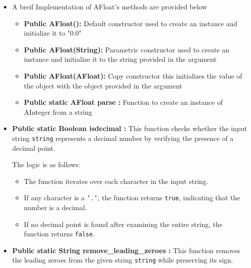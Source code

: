 \documentclass{article}
\begin{document}
\begin{itemize}
    \item A breif Implementation of AFloat's methods are provided below \\
\begin{itemize}
    
    \item \textbf{Public AFloat():} Default constructor used to create an instance and initialize it to "0.0"\\
    
    \item \textbf{Public AFloat(String):} Parametric constructor used to create an instance and initialize it to the string provided in the argument\\
    
    \item \textbf{Public AFloat(AFloat):} Copy constructor this initializes the value of the object with the object provided in the argument\\
    
    \item  \textbf{Public static AFloat parse :} Function to create an instance of AInteger from a string\\
\end{itemize}

\item \textbf{Public static Boolean isdecimal :}
This function checks whether the input string \texttt{string} represents a decimal number by verifying the presence of a decimal point.

The logic is as follows:
\begin{itemize}
    \item The function iterates over each character in the input string.
    \item If any character is a \texttt{'.'}, the function returns \texttt{true}, indicating that the number is a decimal.
    \item If no decimal point is found after examining the entire string, the function returns \texttt{false}.\\
\end{itemize}

\item \textbf{Public static String remove\_leading\_zeroes :} 
This function removes the leading zeroes from the given string \texttt{string} while preserving its sign.


\end{itemize}
\end{document}
